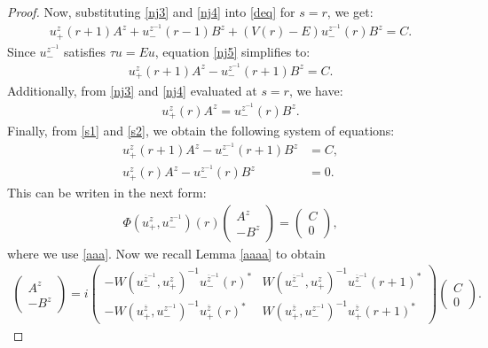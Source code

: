 \documentclass[12pt,oneside,onecolumn,open]{article}
\begin{document}
\begin{proof}
Now, substituting \eqref{nj3} and \eqref{nj4} into \eqref{deq} for \(s = r\), we get:
\begin{align}\label{nj5}
     u_{+}^{z}(r+1) A^{z} + u_{-}^{z^{-1}}(r-1) B^{z} + (V(r) - E) u_{-}^{z^{-1}}(r) B^{z} = C.
\end{align}
Since \(u_{-}^{z^{-1}}\) satisfies \(\tau u = Eu \), equation \eqref{nj5} simplifies to:
\begin{align}\label{s1}
     u_{+}^{z}(r+1) A^{z} - u_{-}^{z^{-1}}(r+1) B^{z} = C.
\end{align}
Additionally, from \eqref{nj3} and \eqref{nj4} evaluated at \(s = r\), we have:
\begin{align}\label{s2}
     u_{+}^{z}(r) A^{z} = u_{-}^{z^{-1}}(r) B^{z}.
\end{align}
Finally, from \eqref{s1} and \eqref{s2}, we obtain the following system of equations:
\begin{align}
     u_{+}^{z}(r+1) A^{z} - u_{-}^{z^{-1}}(r+1) B^{z} &= C, \\
     u_{+}^{z}(r) A^{z} - u_{-}^{z^{-1}}(r) B^{z} &= 0 .
\end{align}
This can be writen in the next form: 
\begin{align}
    \Phi ( u_{+}^{z}, u_{-}^{z^{-1}})(r)
    \begin{pmatrix}
        A^{z}\\
        -B^{z}
         \end{pmatrix}=
          \begin{pmatrix}
        C\\
        0
         \end{pmatrix},
\end{align}
where we use \eqref{aaa}.  Now we recall  Lemma \ref{aaaa} to obtain
\begin{align}
    \begin{pmatrix}
        A^{z}\\
       - B^{z}
         \end{pmatrix}= i\begin{pmatrix}
           -W(u_- ^{\overline{z}^{-1}}, u_+^{z})^{-1}u_- ^{\overline{z}^{-1}}(r)^{*} & W(u_- ^{\overline{z}^{-1}}, u_+^{z})^{-1}u_- ^{\overline{z}^{-1}}(r+1)^{*} \\
           -W(u_+ ^{\overline{z}}, u_-^{z^{-1}})^{-1}u_+ ^{\overline{z}}(r)^{*} & W(u_+ ^{\overline{z}}, u_-^{z^{-1}})^{-1}u_+ ^{\overline{z}}(r+1)^{*}
        \end{pmatrix} \begin{pmatrix}
        C\\
        0
         \end{pmatrix}.
\end{align}


\end{proof}
\end{document}
